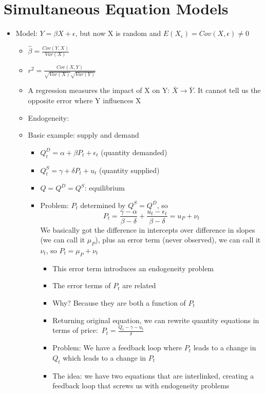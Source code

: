 \documentclass[10pt, oneside]{article}
\begin{document}
\section{Simultaneous Equation Models}
\begin{itemize}
    \item Model: $Y=\beta X + \epsilon$, but now X is random and $E(X_\epsilon) = Cov(X,\epsilon)\neq 0$
    \begin{itemize}
        \item $\hat \beta = \frac{Cov(Y,X)}{Var(X)}$
        \item $r^2 = \frac{Cov(X,Y)}{\sqrt{Var(X)} \sqrt{Var(Y)}}$
        \item A regression measures the impact of X on Y: $\bar X \rightarrow \bar Y$. It cannot tell us the opposite error where Y influences X
        \item Endogeneity: 
        \item Basic example: supply and demand
        \begin{itemize}
            \item $Q_t^D = \alpha + \beta P_t + \epsilon_t$ (quantity demanded)
            \item $Q_t^S = \gamma + \delta P_t + u_t$ (quantity supplied)
            \item $Q=Q^D = Q^S$: equilibrium
            \item Problem: $P_t$ determined by $Q^S = Q^D$, so \[P_t = \frac{\gamma - \alpha}{\beta - \delta} + \frac{u_t - \epsilon_t}{\beta - \delta} = u_P + \nu_t\]
            We basically got the difference in intercepts over difference in slopes (we can call it $\mu_P$), plus an error term (never observed), we can call it $\nu_t$, so $P_t = \mu_P + \nu_t$
            \begin{itemize}
                \item This error term introduces an endogeneity problem
                \item The error terms of $P_t$ are related
                \item Why? Because they are both a function of $P_t$
                \item Returning original equation, we can rewrite quantity equations in terms of price: $P_t = \frac{Q_t - \gamma - u_t}{\delta}$
                \item Problem: We have a feedback loop where $P_t$ leads to a change in $Q_t$ which leads to a change in $P_t$
                \item The idea: we have two equations that are interlinked, creating a feedback loop that screws us with endogeneity problems

\end{itemize}
\end{itemize}
\end{itemize}
\end{itemize}
\end{document}
